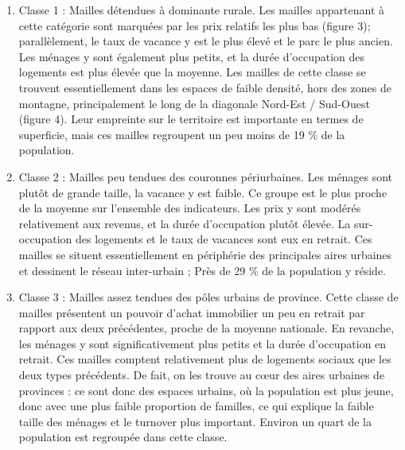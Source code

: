 \documentclass[12pt, a4paper]{article}
\begin{document}
\begin{enumerate}
\item Classe 1 : Mailles détendues à dominante rurale. Les mailles appartenant à cette catégorie sont marquées par les prix relatifs les plus bas (figure 3); parallèlement, le taux de vacance y est le plus élevé et le parc le plus ancien. Les ménages y sont également plus petits, et la durée d'occupation des logements est plus élevée que la moyenne. Les mailles de cette classe se trouvent essentiellement dans les espaces de faible densité, hors des zones de montagne, principalement le long de la diagonale Nord-Est / Sud-Ouest (figure 4). Leur empreinte sur le territoire est importante en termes de superficie, mais ces mailles regroupent un peu moins de 19 \% de la population.

\item Classe 2 : Mailles peu tendues des couronnes périurbaines. Les ménages sont plutôt de grande taille, la vacance y est faible. Ce groupe est le plus proche de la moyenne sur l'ensemble des indicateurs. Les prix y sont modérés relativement aux revenus, et la durée d'occupation plutôt élevée. La sur-occupation des logements et le taux de vacances sont eux en retrait. Ces mailles se situent essentiellement en périphérie des principales aires urbaines et dessinent le réseau inter-urbain ; Près de 29 \% de la population y réside.

\item Classe 3 : Mailles assez tendues des pôles urbains de province. Cette classe de mailles présentent un pouvoir d'achat immobilier un peu en retrait par rapport aux deux précédentes, proche de la moyenne nationale. En revanche, les ménages y sont significativement plus petits et la durée d'occupation en retrait. Ces mailles comptent relativement plus de logements sociaux que les deux types précédents. De fait, on les trouve au cœur des aires urbaines de provinces : ce sont donc des espaces urbains, où la population est plus jeune, donc avec une plus faible proportion de familles, ce qui explique la faible taille des ménages et le turnover plus important. Environ un quart de la population est regroupée dans cette classe.


\end{enumerate}
\end{document}
